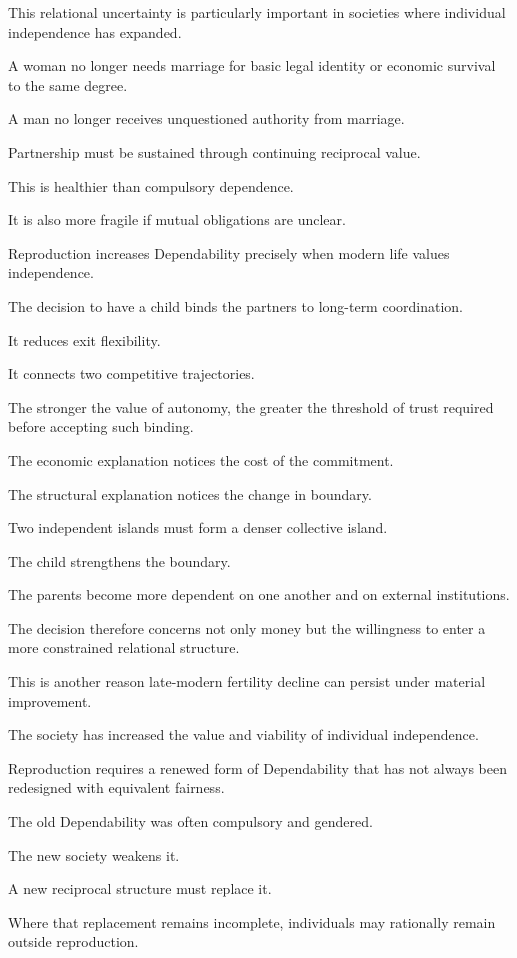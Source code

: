 This relational uncertainty is particularly important in societies where individual independence has expanded.

A woman no longer needs marriage for basic legal identity or economic survival to the same degree.

A man no longer receives unquestioned authority from marriage.

Partnership must be sustained through continuing reciprocal value.

This is healthier than compulsory dependence.

It is also more fragile if mutual obligations are unclear.

Reproduction increases Dependability precisely when modern life values independence.

The decision to have a child binds the partners to long-term coordination.

It reduces exit flexibility.

It connects two competitive trajectories.

The stronger the value of autonomy, the greater the threshold of trust required before accepting such binding.

The economic explanation notices the cost of the commitment.

The structural explanation notices the change in boundary.

Two independent islands must form a denser collective island.

The child strengthens the boundary.

The parents become more dependent on one another and on external institutions.

The decision therefore concerns not only money but the willingness to enter a more constrained relational structure.

This is another reason late-modern fertility decline can persist under material improvement.

The society has increased the value and viability of individual independence.

Reproduction requires a renewed form of Dependability that has not always been redesigned with equivalent fairness.

The old Dependability was often compulsory and gendered.

The new society weakens it.

A new reciprocal structure must replace it.

Where that replacement remains incomplete, individuals may rationally remain outside reproduction.

